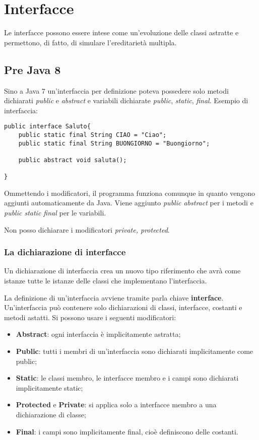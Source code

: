 \section{Interfacce}
 Le interfacce possono essere intese come un'evoluzione delle classi astratte e permettono, di fatto, di simulare l'ereditarietà multipla.
 \subsection{Pre Java 8}
 Sino a Java 7 un'interfaccia per definizione poteva possedere solo metodi dichiarati \textit{public} e \textit{abstract} e variabili dichiarate \textit{public}, \textit{static}, \textit{final}.
 Esempio di interfaccia:
 \begin{lstlisting}
public interface Saluto{
	public static final String CIAO = "Ciao";
	public static final String BUONGIORNO = "Buongiorno";

	public abstract void saluta();

}
 \end{lstlisting}
Ommettendo i modificatori, il programma funziona comunque in quanto vengono aggiunti automaticamente da Java. Viene aggiunto \textit{public abstract} per i metodi e \textit{public static final} per le variabili.

Non posso dichiarare i modificatori \textit{private, protected}.

\subsubsection{La dichiarazione di interfacce}
Un dichiarazione di interfaccia crea un nuovo tipo riferimento che avrà come istanze tutte le istanze delle classi che implementano l'interfaccia.

La definizione di un'interfaccia avviene tramite parla chiave \textbf{interface}. Un'interfaccia può contenere solo dichiarazioni di classi, interfacce, costanti e metodi astatti.
Si possono usare i seguenti modificatori:
\begin{itemize}
	\item \textbf{Abstract}: ogni interfaccia è implicitamente astratta;
	\item \textbf{Public}: tutti i membri di un'interfaccia sono dichiarati implicitamente come public;
	\item \textbf{Static}: le classi membro, le interfacce membro e i campi sono dichiarati implicitamente static;
	\item \textbf{Protected} e \textbf{Private}: si applica solo a interfacce membro a una dichiarazione di classe;
	\item \textbf{Final}: i campi sono implicitamente final, cioè definiscono delle costanti.
	\end{itemize}

